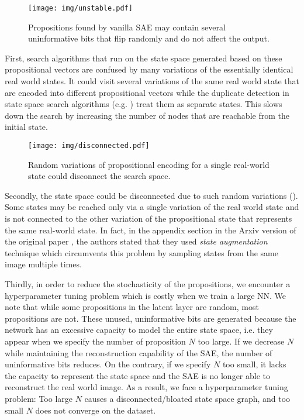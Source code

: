 \begin{figure}[htb]
 \centering
 \texttt{[image: img/unstable.pdf]}
 \caption{Propositions found by vanilla SAE may contain several uninformative bits
 that flip randomly and do not affect the output.}
 \label{unstable}
\end{figure}

First, search algorithms that run on the state space generated based on these propositional vectors
are confused by many variations of the essentially identical real world states.
It could visit several variations of the same real world state that are encoded into different propositional vectors
while the duplicate detection in state space search algorithms (e.g. \astar) treat them as separate states.
This slows down the search by increasing the number of nodes that are reachable from the initial state.

\begin{figure}[htb]
 \centering
 \texttt{[image: img/disconnected.pdf]}
 \caption{Random variations of propositional encoding for a single real-world state could disconnect the search space.}
 \label{disconnected}
\end{figure}

Secondly, the state space could be disconnected due to such random variations ().
Some states may be reached only via a single variation of the real world state and is not connected to the
other variation of the propositional state that represents the same real-world state.
In fact, in the appendix section in the Arxiv version of the original paper \cite{Asai2018},
the authors stated that they used \emph{state augmentation} technique
which circumvents this problem by sampling states from the same image multiple times.

Thirdly, in order to reduce the stochasticity of the propositions, we encounter a hyperparameter tuning problem
which is costly when we train a large NN.
We note that while some propositions in the latent layer are random, most propositions are not.
These unused, uninformative bits are generated because the network has an excessive capacity to 
model the entire state space, i.e. they appear when we specify the number of proposition $N$ too large.
If we decrease $N$ while maintaining the reconstruction capability of the SAE, the number of uninformative bits
reduces.
On the contrary, if we specify $N$ too small, it lacks the capacity to represent the state space
and the SAE is no longer able to reconstruct the
real world image.
As a result, we face a hyperparameter tuning problem: Too large $N$ causes a disconnected/bloated state space graph,
and too small $N$ does not converge on the dataset.

